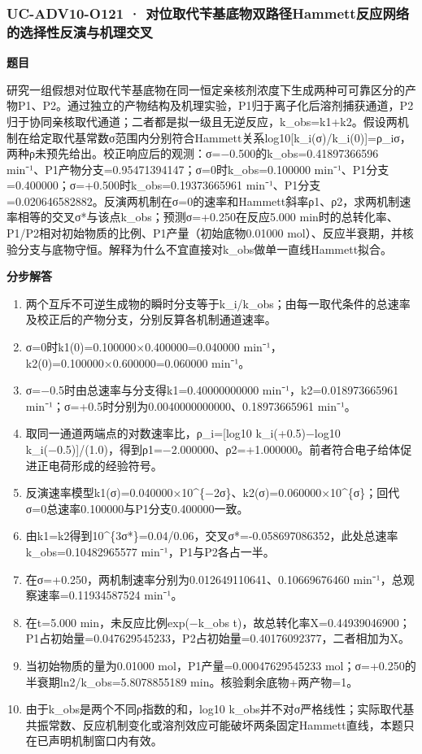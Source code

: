 \documentclass[UTF8,11pt,a4paper]{ctexart}
\begin{document}
\subsubsection*{UC-ADV10-O121 · 对位取代苄基底物双路径Hammett反应网络的选择性反演与机理交叉}
\noindent\textbf{题目}\par
研究一组假想对位取代苄基底物在同一恒定亲核剂浓度下生成两种可可靠区分的产物P1、P2。通过独立的产物结构及机理实验，P1归于离子化后溶剂捕获通道，P2归于协同亲核取代通道；二者都是拟一级且无逆反应，k\_obs=k1+k2。假设两机制在给定取代基常数σ范围内分别符合Hammett关系log10[k\_i(σ)/k\_i(0)]=ρ\_iσ，两种ρ未预先给出。校正响应后的观测：σ=−0.500的k\_obs=0.41897366596 min⁻¹、P1产物分支=0.95471394147；σ=0时k\_obs=0.100000 min⁻¹、P1分支=0.400000；σ=+0.500时k\_obs=0.19373665961 min⁻¹、P1分支=0.020646582882。反演两机制在σ=0的速率和Hammett斜率ρ1、ρ2，求两机制速率相等的交叉σ*与该点k\_obs；预测σ=+0.250在反应5.000 min时的总转化率、P1/P2相对初始物质的比例、P1产量（初始底物0.01000 mol）、反应半衰期，并核验分支与底物守恒。解释为什么不宜直接对k\_obs做单一直线Hammett拟合。\par
\medskip\noindent\textbf{分步解答}
\begin{enumerate}
\item 两个互斥不可逆生成物的瞬时分支等于k\_i/k\_obs；由每一取代条件的总速率及校正后的产物分支，分别反算各机制通道速率。
\item σ=0时k1(0)=0.100000×0.400000=0.040000 min⁻¹，k2(0)=0.100000×0.600000=0.060000 min⁻¹。
\item σ=−0.5时由总速率与分支得k1=0.40000000000 min⁻¹，k2=0.018973665961 min⁻¹；σ=+0.5时分别为0.0040000000000、0.18973665961 min⁻¹。
\item 取同一通道两端点的对数速率比，ρ\_i=[log10 k\_i(+0.5)−log10 k\_i(−0.5)]/(1.0)，得到ρ1=−2.000000、ρ2=+1.000000。前者符合电子给体促进正电荷形成的经验符号。
\item 反演速率模型k1(σ)=0.040000×10\textasciicircum{}\{−2σ\}、k2(σ)=0.060000×10\textasciicircum{}\{σ\}；回代σ=0总速率0.100000与P1分支0.400000一致。
\item 由k1=k2得到10\textasciicircum{}\{3σ*\}=0.04/0.06，交叉σ*=-0.058697086352，此处总速率k\_obs=0.10482965577 min⁻¹，P1与P2各占一半。
\item 在σ=+0.250，两机制速率分别为0.012649110641、0.10669676460 min⁻¹，总观察速率=0.11934587524 min⁻¹。
\item 在t=5.000 min，未反应比例exp(−k\_obs t)，故总转化率X=0.44939046900；P1占初始量=0.047629545233，P2占初始量=0.40176092377，二者相加为X。
\item 当初始物质的量为0.01000 mol，P1产量=0.00047629545233 mol；σ=+0.250的半衰期ln2/k\_obs=5.8078855189 min。核验剩余底物+两产物=1。
\item 由于k\_obs是两个不同ρ指数的和，log10 k\_obs并不对σ严格线性；实际取代基共振常数、反应机制变化或溶剂效应可能破坏两条固定Hammett直线，本题只在已声明机制窗口内有效。
\end{enumerate}
\end{document}
